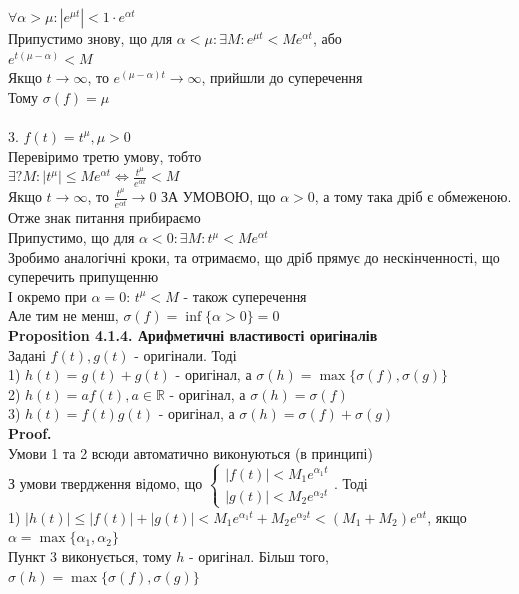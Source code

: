 \documentclass[a4paper, 10pt]{article}
\def\hugespace{\vspace{5mm} \\}
\theoremstyle{theoremdd}
\theoremstyle{theoremdd}
\theoremstyle{theoremdd}
\theoremstyle{theoremdd}
\theoremstyle{theoremdd}
\theoremstyle{theoremdd}
\theoremstyle{theoremdd}
\theoremstyle{theoremdd}
\begin{document}
$\forall \alpha > \mu: |e^{\mu t}| < 1\cdot e^{\alpha t}$\\
Припустимо знову, що для $\alpha < \mu: \exists M: e^{\mu t} < M e^{\alpha t}$, або\\
$e^{t(\mu - \alpha)} < M$\\
Якщо $t \to \infty$, то $e^{(\mu-\alpha)t} \to \infty$, прийшли до суперечення\\
Тому $\sigma(f) = \mu$\\
\\
3. $f(t) = t^{\mu}, \mu>0$\\
Перевіримо третю умову, тобто\\
$\displaystyle \exists? M: |t^{\mu}| \leq Me^{\alpha t} \iff \frac{t^{\mu}}{e^{\alpha t}} < M$\\
Якщо $t \to \infty$, то $\displaystyle \frac{t^{\mu}}{e^{\alpha t}} \to 0$ ЗА УМОВОЮ, що $\alpha > 0$, а тому така дріб є обмеженою. Отже знак питання прибираємо\\
Припустимо, що для $\alpha<0: \exists M: t^{\mu} < Me^{\alpha t}$\\
Зробимо аналогічні кроки, та отримаємо, що дріб прямує до нескінченності, що суперечить припущенню\\
І окремо при $\alpha = 0$: $t^{\mu} < M$ - також суперечення\\
Але тим не менш, $\sigma(f) = \inf\{\alpha > 0\} = 0$
\hugespace
\textbf{Proposition 4.1.4. Арифметичні властивості оригіналів}\\
Задані $f(t), g(t)$ - оригінали. Тоді\\
1) $h(t) = g(t)+g(t)$ - оригінал, а $\sigma(h)=\max\{\sigma(f),\sigma(g)\}$\\
2) $h(t) = af(t), a \in \mathbb{R}$ - оригінал, а $\sigma(h)=\sigma(f)$\\
3) $h(t) = f(t) g(t)$ - оригінал, а $\sigma(h)= \sigma(f) + \sigma(g)$\\
\textbf{Proof.}\\
Умови 1 та 2 всюди автоматично виконуються (в принципі)\\
З умови твердження відомо, що $\begin{cases} |f(t)| < M_1 e^{\alpha_1 t} \\ |g(t)| < M_2 e^{\alpha_2 t} \end{cases}$. Тоді\\
1) $|h(t)| \leq |f(t)| + |g(t)| < M_1 e^{\alpha_1 t} + M_2 e^{\alpha_2 t} < (M_1+M_2)e^{\alpha t}$, якщо $\alpha = \max\{\alpha_1, \alpha_2\}$\\
Пункт 3 виконується, тому $h$ - оригінал. Більш того, $\sigma(h) = \max\{\sigma(f),\sigma(g)\}$\hugespace
\end{document}
